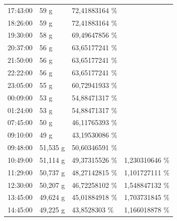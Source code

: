 \begin{table}[]
\begin{tabular}{llll}
		\multicolumn{1}{l}{17:43:00} & \multicolumn{1}{l}{59 g} & \multicolumn{1}{l}{72,41883164   \%} &  \\ 
		\multicolumn{1}{l}{18:26:00} & \multicolumn{1}{l}{59 g} & \multicolumn{1}{l}{72,41883164   \%} &  \\ 
		\multicolumn{1}{l}{19:30:00} & \multicolumn{1}{l}{58 g} & \multicolumn{1}{l}{69,49647856   \%} &  \\ 
		\multicolumn{1}{l}{20:37:00} & \multicolumn{1}{l}{56 g} & \multicolumn{1}{l}{63,65177241   \%} &  \\ 
		\multicolumn{1}{l}{21:50:00} & \multicolumn{1}{l}{56 g} & \multicolumn{1}{l}{63,65177241   \%} &  \\ 
		\multicolumn{1}{l}{22:22:00} & \multicolumn{1}{l}{56 g} & \multicolumn{1}{l}{63,65177241   \%} &  \\ 
		\multicolumn{1}{l}{23:05:00} & \multicolumn{1}{l}{55 g} & \multicolumn{1}{l}{60,72941933   \%} &  \\ 
		\multicolumn{1}{l}{00:09:00} & \multicolumn{1}{l}{53 g} & \multicolumn{1}{l}{54,88471317   \%} &  \\ 
		\multicolumn{1}{l}{01:24:00} & \multicolumn{1}{l}{53 g} & \multicolumn{1}{l}{54,88471317   \%} &  \\ 
		\multicolumn{1}{l}{\cellcolor[HTML]{A5A5A5}07:45:00} & \multicolumn{1}{l}{50 g} & \multicolumn{1}{l}{46,11765393   \%} &  \\ 		\multicolumn{1}{l}{09:10:00} & \multicolumn{1}{l}{49 g} & \multicolumn{1}{l}{43,19530086   \%} &  \\ 
		\multicolumn{1}{l}{09:48:00} & \multicolumn{1}{l}{\cellcolor[HTML]{9BC2E6}51,535 g} & \multicolumn{1}{l}{50,60346591   \%} &  \\ 
		\multicolumn{1}{l}{10:49:00} & \multicolumn{1}{l}{51,114 g} & \multicolumn{1}{l}{49,37315526   \%} & \multicolumn{1}{l}{1,230310646 \%} \\ 
		\multicolumn{1}{l}{11:29:00} & \multicolumn{1}{l}{50,737 g} & \multicolumn{1}{l}{48,27142815   \%} & \multicolumn{1}{l}{1,101727111 \%} \\ 
		\multicolumn{1}{l}{12:30:00} & \multicolumn{1}{l}{50,207 g} & \multicolumn{1}{l}{46,72258102   \%} & \multicolumn{1}{l}{1,548847132 \%} \\ 
		\multicolumn{1}{l}{13:45:00} & \multicolumn{1}{l}{49,624 g} & \multicolumn{1}{l}{45,01884918   \%} & \multicolumn{1}{l}{1,703731845 \%} \\ 
		\multicolumn{1}{l}{14:45:00} & \multicolumn{1}{l}{49,225 g} & \multicolumn{1}{l}{43,8528303   \%} & \multicolumn{1}{l}{1,166018878 \%} \\ 

\end{tabular}
\end{table}

